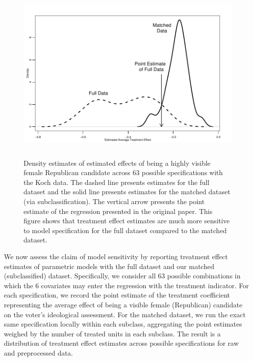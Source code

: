 \documentclass[11pt,titlepage]{article}
\begin{document}
\begin{figure}[t] 
 \begin{center}
    \includegraphics[height=3.5in,angle=0]{figs/kochdens.pdf}
  \end{center}
  \vspace{-0.275in}
  \caption{Density estimates of estimated effects of being
    a highly visible female Republican candidate across 63 possible
    specifications with the Koch data.  The dashed line presents
    estimates for the full dataset and the solid line presents
    estimates for the matched dataset (via subclassification).  The
    vertical arrow presents the point estimate of the regression
    presented in the original paper.  This figure shows that treatment
    effect estimates are much more sensitive to model specification
    for the full dataset compared to the matched dataset.}
  \label{fg:kochdens}
\end{figure}

We now assess the claim of model sensitivity by reporting treatment
effect estimates of parametric models with the full dataset and our
matched (subclassified) dataset.  Specifically, we consider all 63
possible combinations in which the 6 covariates may enter the
regression with the treatment indicator.  For each specification, we
record the point estimate of the treatment coefficient representing
the average effect of being a visible female (Republican) candidate on
the voter's ideological assessment.  For the matched dataset, we run
the exact same specification locally within each subclass, aggregating
the point estimates weighed by the number of treated units in each
subclass.  The result is a distribution of treatment effect estimates
across possible specifications for raw and preprocessed data.
\end{document}
